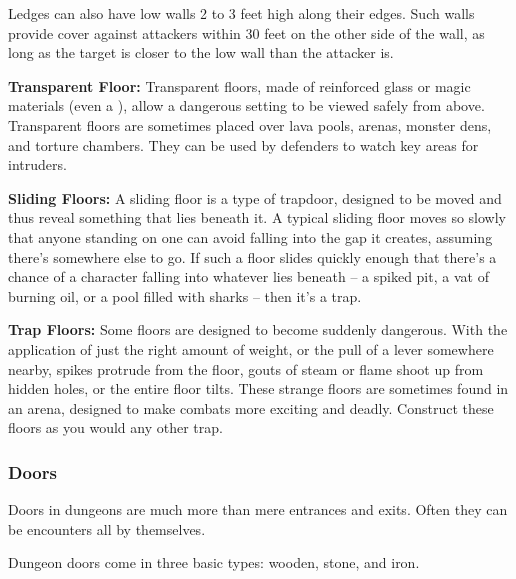 Ledges can also have low walls 2 to 3 feet high along their edges. Such walls provide 
cover against attackers within 30 feet on the other side of the wall, as long as 
the target is closer to the low wall than the attacker is.

\textbf{Transparent Floor:} Transparent floors, made of reinforced glass 
or magic materials (even a ), allow a dangerous setting to 
be viewed safely from above. Transparent floors are sometimes placed over lava 
pools, arenas, monster dens, and torture chambers. They can be used by defenders 
to watch key areas for intruders.

\textbf{Sliding Floors:} A sliding floor is a type of trapdoor, designed to be 
moved and thus reveal something that lies beneath it. A typical sliding floor moves 
so slowly that anyone standing on one can avoid falling into the gap it creates, 
assuming there's somewhere else to go. If such a floor slides quickly enough that 
there's a chance of a character falling into whatever lies beneath -- a spiked pit, 
a vat of burning oil, or a pool filled with sharks -- then it's a trap.

\textbf{Trap Floors:} Some floors are designed to become suddenly dangerous. With 
the application of just the right amount of weight, or the pull of a lever somewhere 
nearby, spikes protrude from the floor, gouts of steam or flame shoot up from hidden 
holes, or the entire floor tilts. These strange floors are sometimes found in an 
arena, designed to make combats more exciting and deadly. Construct these floors 
as you would any other trap. 

\subsubsection{Doors}

Doors in dungeons are much more than mere entrances and exits. Often they can be 
encounters all by themselves. 

Dungeon doors come in three basic types: wooden, stone, and iron.

